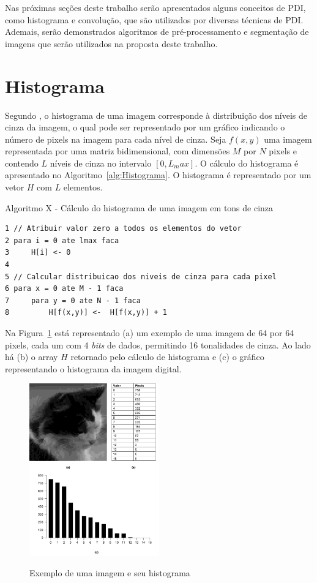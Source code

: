 \documentclass[12pt,oneside,a4paper,english,french,spanish,brazil,]{abntex2}
\begin{document}
Nas próximas seções deste trabalho serão apresentados alguns conceitos de PDI, como histograma e convolução, que são utilizados por diversas técnicas de PDI. Ademais, serão demonstrados algoritmos de pré-processamento e segmentação de imagens que serão utilizados na proposta deste trabalho.

\section{Histograma}

Segundo \citet{pedrini:2008}, o histograma de uma imagem corresponde à distribuição dos níveis de cinza da imagem, o qual pode ser representado por um gráfico indicando o número de pixels na imagem para cada nível de cinza. Seja \(f(x,y)\) uma imagem representada por uma matriz bidimensional, com dimensões \(M\) por \(N\) pixels e contendo \(L\) níveis de cinza no intervalo \([0, L_max]\). O cálculo do histograma é apresentado no Algoritmo~\ref{alg:Histograma}. O histograma é representado por um vetor \(H\) com \(L\) elementos.

\label{alg:Histograma}
Algoritmo X - Cálculo do histograma de uma imagem em tons de cinza
\begin{verbatim}
1 // Atribuir valor zero a todos os elementos do vetor
2 para i = 0 ate lmax faca
3     H[i] <- 0
4     
5 // Calcular distribuicao dos niveis de cinza para cada pixel
6 para x = 0 ate M - 1 faca
7     para y = 0 ate N - 1 faca
8         H[f(x,y)] <-  H[f(x,y)] + 1
\end{verbatim}

Na Figura~\ref{fig:PDI_Histograma} está representado (a) um exemplo de uma imagem de 64 por 64 pixels, cada um com 4 \textit{bits} de dados, permitindo 16 tonalidades de cinza. Ao lado há (b) o array \(H\) retornado pelo cálculo de histograma e (c) o gráfico representando o histograma da imagem digital.

\begin{figure}[ht]
\centering
\caption{Exemplo de uma imagem e seu histograma}
\includegraphics[width=0.5\textwidth]{imagens/PDI_Histograma.pdf}
\sourceAuthor
\label{fig:PDI_Histograma}
\end{figure}
\end{document}
